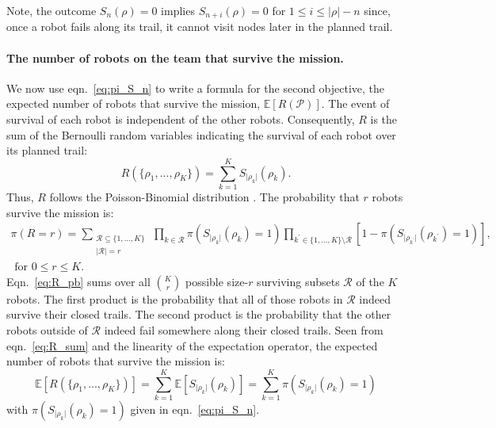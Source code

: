 \documentclass[11pt, oneside]{article}
\begin{document}
Note, the outcome $S_n(\rho)=0$ implies $S_{n+i}(\rho)=0$ for $1 \leq i \leq \lvert \rho \rvert-n$ since, once a robot fails along its trail, it cannot visit nodes later in the planned trail.

\paragraph{The number of robots on the team that survive the mission.}
We now use eqn.~\ref{eq:pi_S_n} to write a formula for the second objective, the expected number of robots that survive the mission, $\mathbb{E}[R(\mathcal{P})]$.
The event of survival of each robot is independent of the other robots.
Consequently, $R$ is the sum of the Bernoulli random variables indicating the survival of each robot over its planned trail:
\begin{equation}
	R(\{\rho_1, ..., \rho_K\})=\sum_{k=1}^K S_{\lvert \rho_k \rvert}(\rho_k). \label{eq:R_sum}
\end{equation}
Thus, $R$ follows the Poisson-Binomial distribution \cite{tang2023poisson}.
The probability that $r$ robots survive the mission is:
\begin{multline}
	\pi(R=r) = \sum_{\substack{\mathcal{R} \subseteq \{1, ..., K\}  \\ \lvert \mathcal{R} \rvert = r} } \,
	\prod_{k \in \mathcal{R}} \pi(S_{\lvert \rho_k \rvert}(\rho_k) = 1)
	\prod_{k^\prime \in \{1, ..., K\} \setminus \mathcal{R}} [1- \pi(S_{\lvert \rho_{k^\prime} \rvert}(\rho_{k^\prime}) = 1)], \\ \text{ for } 0 \leq r \leq K.
	\label{eq:R_pb}
\end{multline}
Eqn.~\ref{eq:R_pb} sums over all $\binom{K}{r}$ possible size-$r$ surviving subsets $\mathcal{R}$ of the $K$ robots. The first product is the probability that all of those robots in $\mathcal{R}$ indeed survive their closed trails. The second product is the probability that the other robots outside of $\mathcal{R}$ indeed fail somewhere along their closed trails.
Seen from eqn.~\ref{eq:R_sum} and the linearity of the expectation operator, the expected number of robots that survive the mission is:
\begin{equation}
	\mathbb{E}[R(\{\rho_1, ..., \rho_K\})]=\sum_{k=1}^K \mathbb{E}[S_{\lvert \rho_k \rvert}(\rho_k)] = \sum_{k=1}^K  \pi(S_{\lvert \rho_k \rvert}(\rho_k) = 1) \label{eq:formula_obj2}
\end{equation} with $\pi(S_{\lvert \rho_k \rvert}(\rho_k) = 1)$ given in eqn.~\ref{eq:pi_S_n}.
\end{document}
